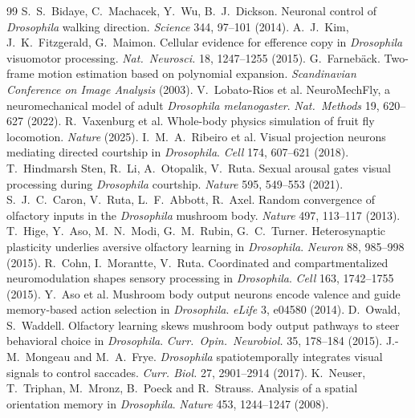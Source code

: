 \documentclass[10pt,a4paper]{article}
\begin{document}
\begin{thebibliography}{99}
 S.~S.~Bidaye, C.~Machacek, Y.~Wu, B.~J.~Dickson. Neuronal control of \emph{Drosophila} walking direction. \emph{Science} 344, 97--101 (2014).
 A.~J.~Kim, J.~K.~Fitzgerald, G.~Maimon. Cellular evidence for efference copy in \emph{Drosophila} visuomotor processing. \emph{Nat.\ Neurosci.} 18, 1247--1255 (2015).
 G.~Farneb\"ack. Two-frame motion estimation based on polynomial expansion. \emph{Scandinavian Conference on Image Analysis} (2003).
 V.~Lobato-Rios et al. NeuroMechFly, a neuromechanical model of adult \emph{Drosophila melanogaster}. \emph{Nat.\ Methods} 19, 620--627 (2022).
 R.~Vaxenburg et al. Whole-body physics simulation of fruit fly locomotion. \emph{Nature} (2025).
 I.~M.~A.~Ribeiro et al. Visual projection neurons mediating directed courtship in \emph{Drosophila}. \emph{Cell} 174, 607--621 (2018).
 T.~Hindmarsh Sten, R.~Li, A.~Otopalik, V.~Ruta. Sexual arousal gates visual processing during \emph{Drosophila} courtship. \emph{Nature} 595, 549--553 (2021).
 S.~J.~C.~Caron, V.~Ruta, L.~F.~Abbott, R.~Axel. Random convergence of olfactory inputs in the \emph{Drosophila} mushroom body. \emph{Nature} 497, 113--117 (2013).
 T.~Hige, Y.~Aso, M.~N.~Modi, G.~M.~Rubin, G.~C.~Turner. Heterosynaptic plasticity underlies aversive olfactory learning in \emph{Drosophila}. \emph{Neuron} 88, 985--998 (2015).
 R.~Cohn, I.~Morantte, V.~Ruta. Coordinated and compartmentalized neuromodulation shapes sensory processing in \emph{Drosophila}. \emph{Cell} 163, 1742--1755 (2015).
 Y.~Aso et al. Mushroom body output neurons encode valence and guide memory-based action selection in \emph{Drosophila}. \emph{eLife} 3, e04580 (2014).
 D.~Owald, S.~Waddell. Olfactory learning skews mushroom body output pathways to steer behavioral choice in \emph{Drosophila}. \emph{Curr.\ Opin.\ Neurobiol.} 35, 178--184 (2015).
 J.-M.~Mongeau and M.~A.~Frye. \emph{Drosophila} spatiotemporally integrates visual signals to control saccades. \emph{Curr. Biol.} 27, 2901--2914 (2017).
 K.~Neuser, T.~Triphan, M.~Mronz, B.~Poeck and R.~Strauss. Analysis of a spatial orientation memory in \emph{Drosophila}. \emph{Nature} 453, 1244--1247 (2008).
\end{thebibliography}
\end{document}
